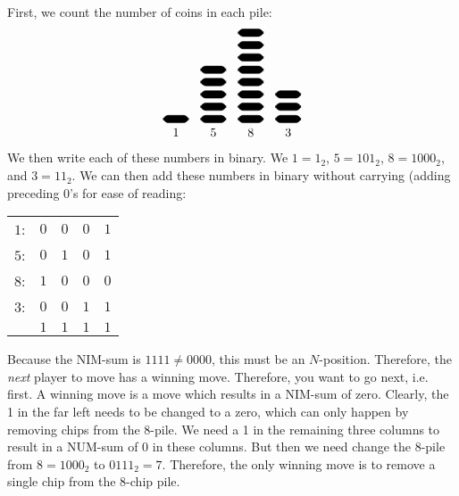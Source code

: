 \documentclass[12pt,letterpaper]{exam}
\begin{document}
\begin{questions}
\sol First, we count the number of coins in each pile: 
	\[
	\begin{tikzpicture}[scale=0.7]
	\draw[rounded corners,fill=black] (0,0) rectangle (1,0.3);
	\node at (0.5,-0.4) {$1$};
	\draw[rounded corners,fill=black] (1.5,0) rectangle (2.5,0.3);
	\draw[rounded corners,fill=black] (1.5,0.5) rectangle (2.5,0.8);
	\draw[rounded corners,fill=black] (1.5,1) rectangle (2.5,1.3);
	\draw[rounded corners,fill=black] (1.5,1.5) rectangle (2.5,1.8);
	\draw[rounded corners,fill=black] (1.5,2) rectangle (2.5,2.3);
	\node at (2,-0.4) {$5$};
	\draw[rounded corners,fill=black] (3,0) rectangle (4,0.3);
	\draw[rounded corners,fill=black] (3,0.5) rectangle (4,0.8);
	\draw[rounded corners,fill=black] (3,1) rectangle (4,1.3);	
	\draw[rounded corners,fill=black] (3,1.5) rectangle (4,1.8);	
	\draw[rounded corners,fill=black] (3,2) rectangle (4,2.3);	
	\draw[rounded corners,fill=black] (3,2.5) rectangle (4,2.8);	
	\draw[rounded corners,fill=black] (3,3) rectangle (4,3.3);	
	\draw[rounded corners,fill=black] (3,3.5) rectangle (4,3.8);	
	\node at (3.5,-0.4) {$8$};
	\draw[rounded corners,fill=black] (4.5,0) rectangle (5.5,0.3);
	\draw[rounded corners,fill=black] (4.5,0.5) rectangle (5.5,0.8);
	\draw[rounded corners,fill=black] (4.5,1) rectangle (5.5,1.3); 
	\node at (5,-0.4) {$3$};
	\end{tikzpicture}
	\]
We then write each of these numbers in binary. We $1= 1_2$, $5= 101_2$, $8= 1000_2$, and $3= 11_2$. We can then add these numbers in binary without carrying (adding preceding 0's for ease of reading: \par
	\begin{table}[h]
	\centering
	\begin{tabular}{rcccc}
	$1$: & $0$ & $0$ & $0$ & $1$ \\
	$5$: & $0$ & $1$ & $0$ & $1$ \\
	$8$: & $1$ & $0$ & $0$ & $0$ \\
	$3$: & $0$ & $0$ & $1$ & $1$ \\ \cline{2-5}
	        & $1$ & $1$ & $1$ & $1$
	\end{tabular}
	\end{table} \par
Because the NIM-sum is $1111 \neq 0000$, this must be an $N$-position. Therefore, the \textit{next} player to move has a winning move. Therefore, you want to go next, i.e. first. A winning move is a move which results in a NIM-sum of zero. Clearly, the 1 in the far left needs to be changed to a zero, which can only happen by removing chips from the 8-pile. We need a 1 in the remaining three columns to  result in a NUM-sum of 0 in these columns. But then we need change the 8-pile from $8= 1000_2$ to $0111_2= 7$. Therefore, the only winning move is to remove a single chip from the 8-chip pile. 




\end{questions}
\end{document}
